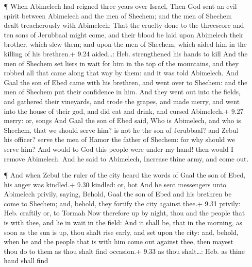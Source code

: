  ¶ When Abimelech had reigned three years over Israel,
 Then God sent an evil spirit between Abimelech and the men
of Shechem; and the men of Shechem dealt treacherously with Abimelech:
 That the cruelty done to the threescore and ten sons of
Jerubbaal might come, and their blood be laid upon Abimelech their
brother, which slew them; and upon the men of Shechem, which aided him
in the killing of his brethren.+ 9.24 aided\ldots: Heb. strengthened his
hands to kill  And the men of Shechem set liers in wait for
him in the top of the mountains, and they robbed all that came along
that way by them: and it was told Abimelech.  And Gaal the
son of Ebed came with his brethren, and went over to Shechem: and the
men of Shechem put their confidence in him.  And they went
out into the fields, and gathered their vineyards, and trode the grapes,
and made merry, and went into the house of their god, and did eat and
drink, and cursed Abimelech.+ 9.27 merry: or, songs  And
Gaal the son of Ebed said, Who is Abimelech, and who is Shechem, that we
should serve him? is not he the son of Jerubbaal? and Zebul his officer?
serve the men of Hamor the father of Shechem: for why should we serve
him?  And would to God this people were under my hand! then
would I remove Abimelech. And he said to Abimelech, Increase thine army,
and come out.

 ¶ And when Zebul the ruler of the city heard the words of
Gaal the son of Ebed, his anger was kindled.+ 9.30 kindled: or, hot
 And he sent messengers unto Abimelech privily, saying,
Behold, Gaal the son of Ebed and his brethren be come to Shechem; and,
behold, they fortify the city against thee.+ 9.31 privily: Heb. craftily
or, to Tormah  Now therefore up by night, thou and the
people that is with thee, and lie in wait in the field: 
And it shall be, that in the morning, as soon as the sun is up, thou
shalt rise early, and set upon the city: and, behold, when he and the
people that is with him come out against thee, then mayest thou do to
them as thou shalt find occasion.+ 9.33 as thou shalt\ldots: Heb. as
thine hand shall find

